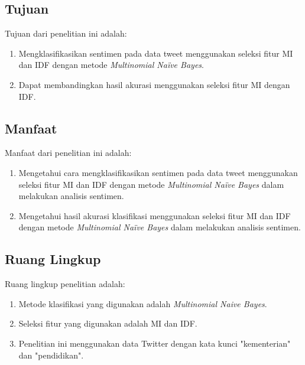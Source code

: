 \subsection*{Tujuan}
Tujuan dari penelitian ini adalah:
\begin{enumerate}[noitemsep] 
	\item Mengklasifikasikan sentimen  pada data tweet menggunakan seleksi fitur MI dan IDF dengan metode \textit{Multinomial Naïve Bayes}.
	\item Dapat membandingkan hasil akurasi menggunakan seleksi fitur MI dengan IDF.
\end{enumerate}

\subsection*{Manfaat}
Manfaat dari penelitian ini adalah:
\begin{enumerate}[noitemsep] 
	\item Mengetahui cara mengklasifikasikan sentimen pada data tweet menggunakan seleksi fitur MI dan IDF dengan metode \textit{Multinomial Naïve Bayes} dalam melakukan analisis sentimen.
	\item Mengetahui hasil akurasi klasifikasi menggunakan seleksi fitur MI dan IDF dengan metode \textit{Multinomial Naïve Bayes} dalam melakukan analisis sentimen.
\end{enumerate}

\subsection*{Ruang Lingkup}
Ruang lingkup penelitian adalah:
\begin{enumerate}[noitemsep] 
	\item Metode klasifikasi yang digunakan adalah \textit{Multinomial Naive Bayes}.
	\item Seleksi fitur yang digunakan adalah MI dan IDF.  
	\item Penelitian ini menggunakan data Twitter dengan kata kunci "kementerian" dan "pendidikan".
\end{enumerate}

